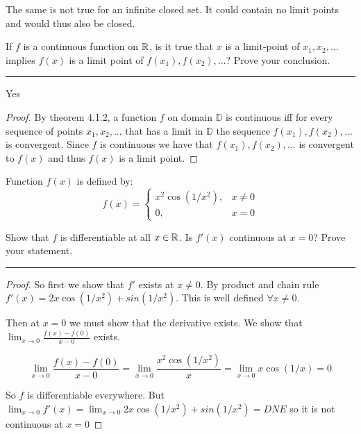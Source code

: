 \documentclass[11pt]{article}
\begin{document}
The same is not true for an infinite closed set. It could contain no limit points and would thus also be closed.






If $f$ is a continuous function on $\mathbb{R}$, is it true that $x$ is a limit-point of $x_1, x_2, ...$ implies $f(x)$ is a limit point of $f(x_1), f(x_2), ...$? Prove your conclusion.

\hrule

Yes

\begin{proof}


By theorem 4.1.2, a function $f$ on domain $\mathbb{D}$ is continuous iff for every sequence of points $x_1, x_2, ...$ that has a limit in $\mathbb{D}$ the sequence $f(x_1), f(x_2), ...$ is convergent. Since $f$ is continuous we have that $f(x_1), f(x_2),...$ is convergent to $f(x)$ and thus $f(x)$ is a limit point.



\end{proof}





Function $f(x)$ is defined by:
$$f(x) = \begin{cases}
x^2 \cos(1/x^2), & x \neq 0\\
0, & x = 0
\end{cases}$$

Show that $f$ is differentiable at all $x \in \mathbb{R}$. Is $f'(x)$ continuous at $x = 0$? Prove your statement.

\hrule

\begin{proof}

So first we show that $f'$ exists at $x \neq 0$. By product and chain rule $f'(x) = 2x \cos (1/x^2) + sin(1/x^2)$.
This is well defined $\forall x \neq 0$. 

Then at $x = 0$ we must show that the derivative exists. We show that $\lim_{x \to 0} \frac{f(x) - f(0)}{x - 0}$ exists. 

$$\lim_{x \to 0} \frac{f(x) - f(0)}{x - 0} = \lim_{x \to 0} \frac{x^2 \cos(1/x^2)}{x} =  \lim_{x \to 0} x \cos(1/x) = 0$$

So $f$ is differentiable everywhere. But $\lim_{x \to 0} f'(x) = \lim_{x \to 0} 2x \cos (1/x^2) + sin(1/x^2) = DNE$ so it is not continuous at $x = 0$

\end{proof}	
\end{document}
